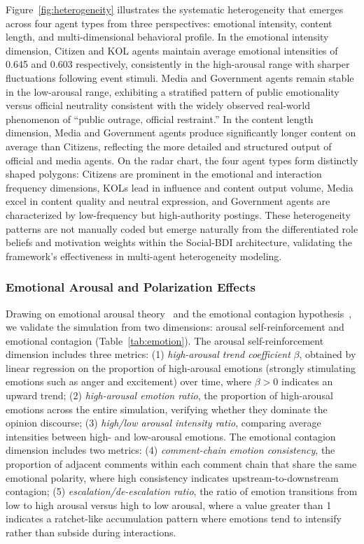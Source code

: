 \documentclass[a4paper,fleqn]{cas-dc}
\begin{document}
Figure~\ref{fig:heterogeneity} illustrates the systematic heterogeneity that emerges across four agent types from three perspectives: emotional intensity, content length, and multi-dimensional behavioral profile. In the emotional intensity dimension, Citizen and KOL agents maintain average emotional intensities of 0.645 and 0.603 respectively, consistently in the high-arousal range with sharper fluctuations following event stimuli. Media and Government agents remain stable in the low-arousal range, exhibiting a stratified pattern of public emotionality versus official neutrality consistent with the widely observed real-world phenomenon of ``public outrage, official restraint.'' In the content length dimension, Media and Government agents produce significantly longer content on average than Citizens, reflecting the more detailed and structured output of official and media agents. On the radar chart, the four agent types form distinctly shaped polygons: Citizens are prominent in the emotional and interaction frequency dimensions, KOLs lead in influence and content output volume, Media excel in content quality and neutral expression, and Government agents are characterized by low-frequency but high-authority postings. These heterogeneity patterns are not manually coded but emerge naturally from the differentiated role beliefs and motivation weights within the Social-BDI architecture, validating the framework's effectiveness in multi-agent heterogeneity modeling.

\subsubsection{Emotional Arousal and Polarization Effects}

Drawing on emotional arousal theory~\citep{berger_what_2012} and the emotional contagion hypothesis~\citep{hatfield_emotional_1994}, we validate the simulation from two dimensions: arousal self-reinforcement and emotional contagion (Table~\ref{tab:emotion}). The arousal self-reinforcement dimension includes three metrics: (1) \textit{high-arousal trend coefficient} $\beta$, obtained by linear regression on the proportion of high-arousal emotions (strongly stimulating emotions such as anger and excitement) over time, where $\beta>0$ indicates an upward trend; (2) \textit{high-arousal emotion ratio}, the proportion of high-arousal emotions across the entire simulation, verifying whether they dominate the opinion discourse; (3) \textit{high/low arousal intensity ratio}, comparing average intensities between high- and low-arousal emotions. The emotional contagion dimension includes two metrics: (4) \textit{comment-chain emotion consistency}, the proportion of adjacent comments within each comment chain that share the same emotional polarity, where high consistency indicates upstream-to-downstream contagion; (5) \textit{escalation/de-escalation ratio}, the ratio of emotion transitions from low to high arousal versus high to low arousal, where a value greater than 1 indicates a ratchet-like accumulation pattern where emotions tend to intensify rather than subside during interactions.
\end{document}
